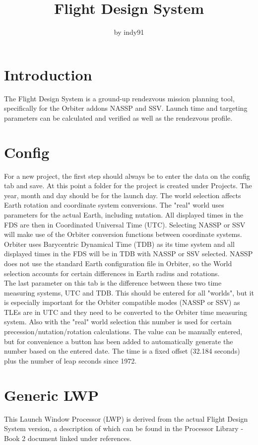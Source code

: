 \documentclass[11pt]{article} %
\title{Flight Design System}
\author{by indy91}
\begin{document}
\maketitle

\section{Introduction}

The Flight Design System is a ground-up rendezvous mission planning tool, specifically for the Orbiter addons NASSP and SSV. Launch time and targeting parameters can be calculated and verified as well as the rendezvous profile.\\

\newpage
\section{Config}
For a new project, the first step should always be to enter the data on the config tab and save. At this point a folder for the project is created under Projects. The year, month and day should be for the launch day. The world selection affects Earth rotation and coordinate system conversions. The "real" world uses parameters for the actual Earth, including nutation. All displayed times in the FDS are then in Coordinated Universal Time (UTC).  Selecting NASSP or SSV will make use of the Orbiter conversion functions between coordinate systems.  Orbiter uses Barycentric Dynamical Time (TDB) as its time system and all displayed times in the FDS will be in TDB with NASSP or SSV selected. NASSP does not use the standard Earth configuration file in Orbiter, so the World selection accounts for certain differences in Earth radius and rotations. \\
The last parameter on this tab is the difference between these two time measuring systems, UTC and TDB. This should be entered for all "worlds", but it is especially important for the Orbiter compatible modes (NASSP or SSV) as TLEs are in UTC and they need to be converted to the Orbiter time measuring system. Also with the "real" world selection this number is used for certain precession/nutation/rotation calculations. The value can be manually entered, but for convenience a button has been added to automatically generate the number based on the entered date. The time is a fixed offset (32.184 seconds) plus the number of leap seconds since 1972.\\
\newpage
\section{Generic LWP}
This Launch Window Processor (LWP) is derived from the actual Flight Design System version, a description of which can be found in the Processor Library - Book 2 document linked under references.\\
\newpage
\end{document}
